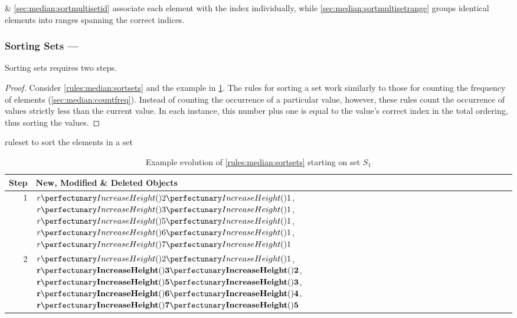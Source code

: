  \& \cref{sec:median:sortmultisetid} associate each element with the index individually, while \cref{sec:median:sortmultisetrange} groups identical elements into ranges spanning the correct indices.

\subsubsection{Sorting Sets --- }  \label{sec:median:sortsets}

\begin{proposition}\label{prop:median:sortsets}
Sorting sets requires two steps.
\end{proposition}

\begin{proof}
Consider \cref{rules:median:sortsets} and the example in \cref{tab:median:sortsets}.  The rules for sorting a set work similarly to those for counting the frequency of elements (\cref{sec:median:countfreq}).  Instead of counting the occurrence of a particular value, however, these rules count the occurrence of values strictly less than the current value.  In each instance, this number plus one is equal to the value's correct index in the total ordering, thus sorting the values.
\end{proof}

\begin{cprulesetfloat}
\begin{cpruleset}

\end{cpruleset}
\caption{\label{rules:median:sortsets}\Gls{ruleset} to sort the elements in a set}
\end{cprulesetfloat}

\begin{table}[htbp]
\centering
   \begin{tabular}{|r|l|}
    \hline
    \textbf{Step} & \textbf{New, Modified \& Deleted Objects} \\ \hline
    1 & \(\cpfuncn{r}{2}{1}\), \(\cpfuncn{r}{3}{1}\), \(\cpfuncn{r}{5}{1}\), \(\cpfuncn{r}{6}{1}\), \(\cpfuncn{r}{7}{1}\)\\ \hline
    2 & \(\cpfuncn{r}{2}{1}\), \(\mathbf{\cpfuncn{r}{3}{2}}\), \(\mathbf{\cpfuncn{r}{5}{3}}\), \(\mathbf{\cpfuncn{r}{6}{4}}\), \(\mathbf{\cpfuncn{r}{7}{5}}\)\\ \hline

\end{tabular}
\caption[Example evolution of \cref{rules:median:sortsets} to sort the elements in a set]{\label{tab:median:sortsets}Example evolution of \cref{rules:median:sortsets} starting on set \(S_1\)}
\end{table}

